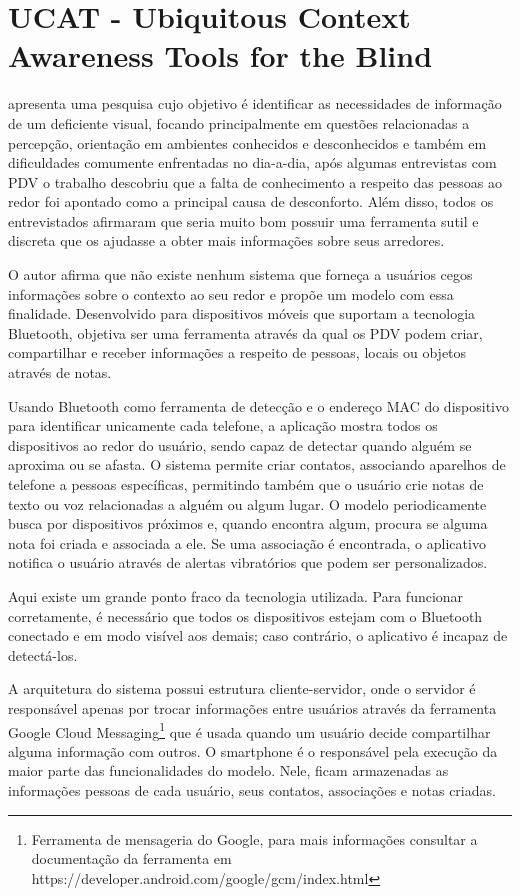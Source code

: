\documentclass[english,brazilian]{UNISINOSmonografia}
\begin{document}
	\section{UCAT - Ubiquitous Context Awareness Tools for the Blind}
 apresenta uma pesquisa cujo objetivo é identificar as necessidades de informação de um deficiente visual, focando principalmente em questões relacionadas a percepção, orientação em ambientes conhecidos e desconhecidos e também em dificuldades comumente enfrentadas no dia-a-dia, após algumas entrevistas com PDV o trabalho descobriu que a falta de conhecimento a respeito das pessoas ao redor foi apontado como a principal causa de desconforto. Além disso, todos os entrevistados afirmaram que seria muito bom possuir uma ferramenta sutil e discreta que os ajudasse a obter mais informações sobre seus arredores.

O autor afirma que não existe nenhum sistema que forneça a usuários cegos informações sobre o contexto ao seu redor e propõe um modelo com essa finalidade. Desenvolvido para dispositivos móveis que suportam a tecnologia Bluetooth, objetiva ser uma ferramenta através da qual os PDV podem criar, compartilhar e receber informações a respeito de pessoas, locais ou objetos através de notas. 

Usando Bluetooth como ferramenta de detecção e o endereço MAC do dispositivo para identificar unicamente cada telefone, a aplicação mostra todos os dispositivos ao redor do usuário, sendo capaz de detectar quando alguém se aproxima ou se afasta. O sistema permite criar contatos, associando aparelhos de telefone a pessoas específicas, permitindo também que o usuário crie notas de texto ou voz relacionadas a alguém ou algum lugar. O modelo periodicamente busca por dispositivos próximos e, quando encontra algum, procura se alguma nota foi criada e associada a ele. Se uma associação é encontrada, o aplicativo notifica o usuário através de alertas vibratórios que podem ser personalizados.

Aqui existe um grande ponto fraco da tecnologia utilizada. Para funcionar corretamente, é necessário que todos os dispositivos estejam com o Bluetooth conectado e em modo visível aos demais; caso contrário, o aplicativo é incapaz de detectá-los.

A arquitetura do sistema possui estrutura cliente-servidor, onde o servidor é responsável apenas por trocar informações entre usuários através da ferramenta Google Cloud Messaging\footnote{Ferramenta de mensageria do Google, para mais informações consultar a documentação da ferramenta em https://developer.android.com/google/gcm/index.html} que é usada quando um usuário decide compartilhar alguma informação com outros. O smartphone é o responsável pela execução da maior parte das funcionalidades do modelo. Nele, ficam armazenadas as informações pessoas de cada usuário, seus contatos, associações e notas criadas.
\end{document}
